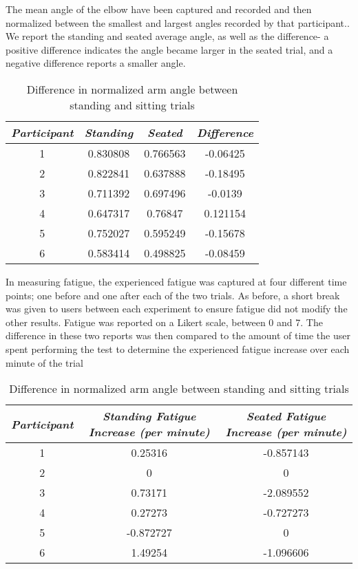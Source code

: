 The mean angle of the elbow have been captured and recorded and then normalized between the smallest and largest angles recorded by that participant.. We report the standing and seated average angle, as well as the difference- a positive difference indicates the angle became larger in the seated trial, and a negative difference reports a smaller angle.

\begin{table}
\centering
\begin{tabular}{ c | c | c | c }
\hline
\emph{Participant} & \emph{Standing} & \emph{Seated} & \emph{Difference} \\
\hline
1 & 0.830808 & 0.766563 & -0.06425 \\
2 & 0.822841 & 0.637888 & -0.18495 \\
3 & 0.711392 & 0.697496 & -0.0139 \\
4 & 0.647317 & 0.76847 & 0.121154 \\
5 & 0.752027 & 0.595249 & -0.15678 \\
6 & 0.583414 & 0.498825 & -0.08459 \\
\end{tabular}
\caption{Difference in normalized arm angle between standing and sitting trials}
\end{table}

In measuring fatigue, the experienced fatigue was captured at four different time points; one before and one after each of the two trials. As before, a short break was given to users between each experiment to ensure fatigue did not modify the other results. Fatigue was reported on a Likert scale, between 0 and 7. The difference in these two reports was then compared to the amount of time the user spent performing the test to determine the experienced fatigue increase over each minute of the trial 

\begin{table}
\centering
\begin{tabular}{ c | c | c }
\hline
\emph{Participant} & \emph{Standing Fatigue Increase (per minute)} & \emph{Seated Fatigue Increase (per minute)} \\
\hline
1 & 0.25316 & -0.857143 \\
2 & 0 & 0 \\
3 & 0.73171 & -2.089552 \\ 
4 & 0.27273 & -0.727273 \\
5 & -0.872727 & 0 \\
6 & 1.49254 & -1.096606 \\
\end{tabular}
\caption{Difference in normalized arm angle between standing and sitting trials}
\end{table}

